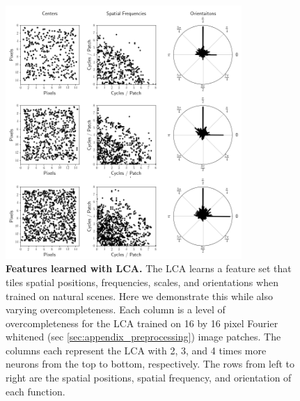 \begin{figure}[ht]
    \centering
    \includegraphics[width=0.8\textwidth]{figures/lca_overcompleteness_location_frequency_centers.png}
    \caption{\textbf{Features learned with LCA.} The LCA learns a feature set that tiles spatial positions, frequencies, scales, and orientations when trained on natural scenes. Here we demonstrate this while also varying overcompleteness. Each column is a level of overcompleteness for the LCA trained on 16 by 16 pixel Fourier whitened (sec \ref{sec:appendix_preprocessing}) image patches. The columns each represent the LCA with 2, 3, and 4 times more neurons from the top to bottom, respectively. The rows from left to right are the spatial positions, spatial frequency, and orientation of each function.}
    \label{fig:ch2_lca_overcompleteness_tiling}
\end{figure}

